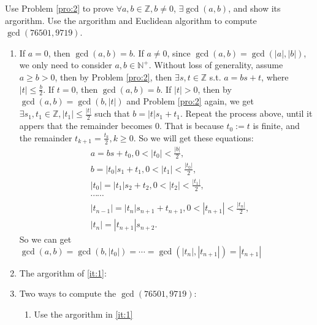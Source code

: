 \documentclass{ctexart}
\begin{document}
\begin{problem}
	Use Problem \ref{pro:2} to prove \(\forall a,b \in \mathbb{Z}, b \neq 0\), \(\exists \gcd(a,b)\), and show its argorithm.
	Use the argorithm and Euclidean algorithm to compute \(\gcd(76501,9719)\).
\end{problem}
\begin{solution}
	\begin{enumerate}
		\item \label{it:1} If \(a =0\), then \(\gcd(a,b) = b\).
			If \(a \neq 0\), since \(\gcd(a,b) = \gcd(|a|,|b|)\), we only need to consider \(a,b \in \mathbb{N}^+\).
			Without loss of generality, assume \(a \geq b > 0\), then by
			Problem \ref{pro:2}, then \(\exists s, t \in \mathbb{Z}\) s.t. \(a = bs + t\), where \(|t| \leq \frac{b}{2}\).
			If \(t=0\), then \(\gcd(a,b) =b\). If \(|t| >0\), then by \(\gcd(a,b) = \gcd(b,|t|)\) and Problem \ref{pro:2} again, we get \(\exists s_1,t_1 \in \mathbb{Z}, |t_1| \leq \frac{|t|}{2}\) such that
			\(b = |t|s_1 + t_1\). Repeat the process above, until it appers that the remainder becomes \(0\).
			That is because \(t_0:=t\) is finite, and the remainder \( t_{k + 1} = \frac{t_k}{2}, k \geq 0\).
			So we will get these equations:
			\begin{equation}
				\begin{aligned}
					 & a = bs + t_0, 0 < |t_0| < \frac{|b|}{2},                           \\
					 & b = |t_0|s_1 + t_1, 0 < |t_1| < \frac{|t_0|}{2},                   \\
					 & |t_0| = |t_1|s_2 + t_2, 0 < |t_2| < \frac{|t_1|}{2},               \\
					 & \cdots\cdots                                                       \\
					 & |t_{n-1}| = |t_{n}|s_{n+1}+t_{n+1}, 0< |t_{n+1}| <\frac{|t_n|}{2}, \\
					 & |t_{n}| = |t_{n+1}|s_{n+2}.
				\end{aligned}
			\end{equation}
			So we can get \(\gcd(a,b)=\gcd(b,|t_0|)=\cdots=\gcd(|t_n|,|t_{n+1}|)=|t_{n+1}|\)
		\item The argorithm of \ref{it:1}:
			
		\item Two ways to compute the \(\gcd(76501,9719)\):\\
			\begin{enumerate}
				\item Use the argorithm in \ref{it:1}
					\[
						\begin{aligned}

\end{aligned}\]
\end{enumerate}
\end{enumerate}
\end{solution}
\end{document}
